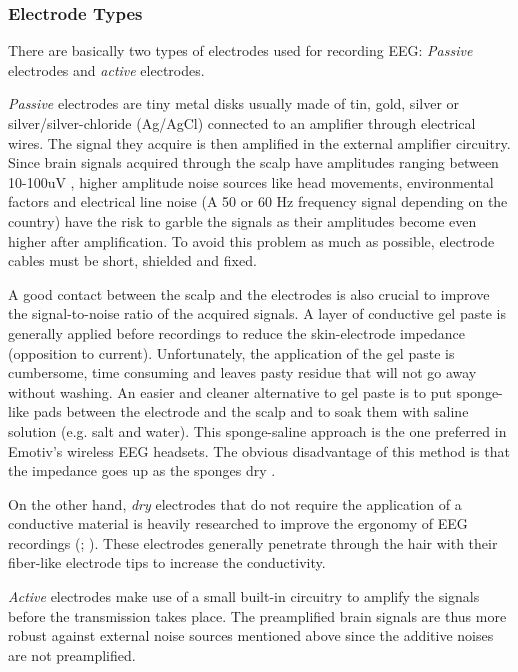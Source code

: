 \documentclass[12pt]{article}
\newcommand\mysubsubsection[1]{\subsubsection{#1}}
\numberwithin{equation}{section}
\numberwithin{figure}{section}
\numberwithin{table}{section}
\begin{document}
\mysubsubsection{Electrode Types}\label{seq:eeg_electrode_types}
\par{
    There are basically two types of electrodes used for recording EEG: \emph{Passive} electrodes and
    \emph{active} electrodes.
}
\par{
    \emph{Passive} electrodes are tiny metal disks usually made of tin, gold, silver
    or silver/silver-chloride (Ag/AgCl) connected to an amplifier
    through electrical wires. The signal they acquire is then amplified in the
    external amplifier circuitry. Since brain signals acquired through the scalp
    have amplitudes ranging between 10-100uV \citep{sanei_eeg_2008}, higher amplitude noise sources like
    head movements, environmental factors and electrical line noise (A 50 or 60 Hz
    frequency signal depending on the country) have the risk to garble the signals as their
    amplitudes become even higher after amplification. To avoid this problem as much as
    possible, electrode cables must be short, shielded and fixed.
}
\par{
    A good contact between the scalp and the electrodes is also crucial to
    improve the signal-to-noise ratio of the acquired signals. A layer of conductive
    gel paste is generally applied before recordings to reduce the skin-electrode impedance (opposition to current).
    Unfortunately, the application of the gel paste is cumbersome, time consuming and
    leaves pasty residue that will not go away without washing. An easier and
    cleaner alternative to gel paste is to put sponge-like pads between the
    electrode and the scalp and to soak them with saline solution (e.g. salt and water).
    This sponge-saline approach is the one preferred in Emotiv's wireless
    EEG headsets. The obvious disadvantage of this method is that the impedance
    goes up as the sponges dry \citep{wolpaw_brain-computer_2012}.
}
\par{
    On the other hand, \emph{dry} electrodes
    that do not require the application of a conductive material is heavily
    researched to improve the ergonomy of EEG recordings (\citealp{popescu_single_2007}; \citealp{grozea_bristle-sensorslow-cost_2011}).
    These electrodes generally penetrate through the hair
    with their fiber-like electrode tips to increase the conductivity.
}
\par{
    \emph{Active} electrodes make use of a small built-in circuitry to amplify
    the signals before the transmission takes place. The preamplified brain signals
    are thus more robust against external noise sources mentioned above since
    the additive noises are not preamplified.
}
\end{document}
